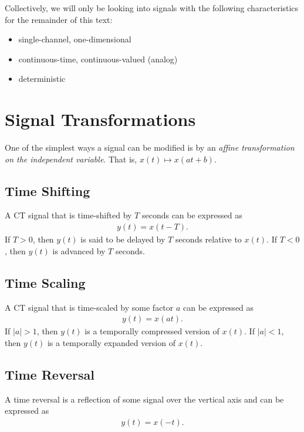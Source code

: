 \documentclass{report}
\begin{document}
\begin{tcolorbox}[width=\textwidth,colback={white}, sharp corners]
Collectively, we will only be looking into signals with the following characteristics for the remainder of this text:
\begin{itemize}
    \item single-channel, one-dimensional
    \item continuous-time, continuous-valued (analog)
    \item deterministic
\end{itemize}
\end{tcolorbox}

\section{Signal Transformations}
One of the simplest ways a signal can be modified is by an \emph{affine transformation on the independent variable}. That is, $x(t) \mapsto x(at+b)$.

\subsection{Time Shifting}
A CT signal that is time-shifted by $T$ seconds can be expressed as 
\begin{align}
    y(t) = x(t-T).
\end{align}
If $T>0$, then $y(t)$ is said to be delayed by $T$ seconds relative to $x(t)$. If $T<0$, then $y(t)$ is advanced by $T$ seconds.

\subsection{Time Scaling}
A CT signal that is time-scaled by some factor $a$ can be expressed as 
\begin{align}
    y(t) = x(at).
\end{align}
If $|a|>1$, then $y(t)$ is a temporally compressed version of $x(t)$. If $|a|<1$, then $y(t)$ is a temporally expanded version of $x(t)$.

\subsection{Time Reversal}
A time reversal is a reflection of some signal over the vertical axis and can be expressed as 
\begin{align}
    y(t)=x(-t).
\end{align}
\end{document}
